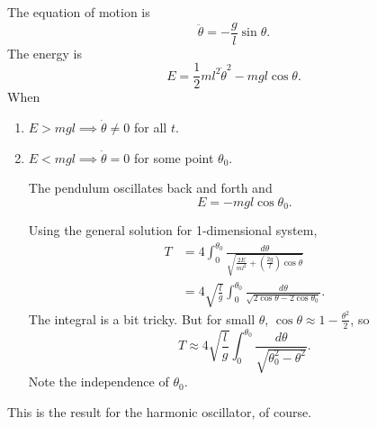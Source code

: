 \begin{example}
    The equation of motion is
    \[
        \ddot{\theta} = -\frac{g}{l}\sin \theta.
    \]
    The energy is
    \[
        E = \frac{1}{2}ml^2\dot{\theta}^2 - mgl\cos \theta.
    \]
    When
    \begin{enumerate}
        \item \(E>mgl \implies \dot{\theta} \neq 0\) for all \(t\).
        \item \(E<mgl \implies \dot{\theta} = 0\) for some point \(\theta_0\).

        The pendulum oscillates back and forth and
        \[
            E = -mgl\cos \theta_0.
        \]

        Using the general solution for 1-dimensional system,
        \begin{align*}
            T &= 4\int_0^{\theta_0}\frac{d\theta}{\sqrt{\frac{2E}{ml^2} + (\frac{2g}{l})\cos \theta} }\\
            &= 4\sqrt{\frac{l}{g}} \int_0^{\theta_0}\frac{d\theta}{\sqrt{2\cos \theta - 2\cos \theta_0} }.
        \end{align*}
        The integral is a bit tricky. But for small \(\theta\), \(\cos \theta \approx 1 - \frac{\theta^2}{2}\), so
        \[
            T \approx 4 \sqrt{\frac{l}{g}}\int_0^{\theta_0}\frac{d\theta}{\sqrt{\theta_0^2 - \theta^2} } .
        \]
        Note the independence of \(\theta_0\).
    \end{enumerate}
    This is the result for the harmonic oscillator, of course.
\end{example}
